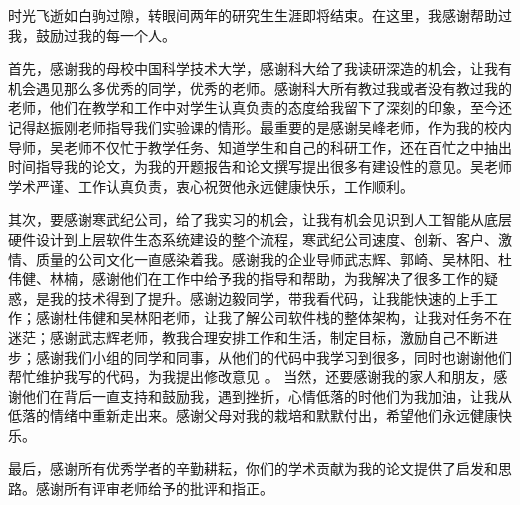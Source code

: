 
\begin{acknowledgments}
时光飞逝如白驹过隙，转眼间两年的研究生生涯即将结束。在这里，我感谢帮助过我，鼓励过我的每一个人。

首先，感谢我的母校中国科学技术大学，感谢科大给了我读研深造的机会，让我有机会遇见那么多优秀的同学，优秀的老师。感谢科大所有教过我或者没有教过我的老师，他们在教学和工作中对学生认真负责的态度给我留下了深刻的印象，至今还记得赵振刚老师指导我们实验课的情形。最重要的是感谢吴峰老师，作为我的校内导师，吴老师不仅忙于教学任务、知道学生和自己的科研工作，还在百忙之中抽出时间指导我的论文，为我的开题报告和论文撰写提出很多有建设性的意见。吴老师学术严谨、工作认真负责，衷心祝贺他永远健康快乐，工作顺利。

其次，要感谢寒武纪公司，给了我实习的机会，让我有机会见识到人工智能从底层硬件设计到上层软件生态系统建设的整个流程，寒武纪公司速度、创新、客户、激情、质量的公司文化一直感染着我。感谢我的企业导师武志辉、郭崎、吴林阳、杜伟健、林楠，感谢他们在工作中给予我的指导和帮助，为我解决了很多工作的疑惑，是我的技术得到了提升。感谢边毅同学，带我看代码，让我能快速的上手工作；感谢杜伟健和吴林阳老师，让我了解公司软件栈的整体架构，让我对任务不在迷茫；感谢武志辉老师，教我合理安排工作和生活，制定目标，激励自己不断进步；感谢我们小组的同学和同事，从他们的代码中我学习到很多，同时也谢谢他们帮忙维护我写的代码，为我提出修改意见
。
当然，还要感谢我的家人和朋友，感谢他们在背后一直支持和鼓励我，遇到挫折，心情低落的时他们为我加油，让我从低落的情绪中重新走出来。感谢父母对我的栽培和默默付出，希望他们永远健康快乐。

最后，感谢所有优秀学者的辛勤耕耘，你们的学术贡献为我的论文提供了启发和思路。感谢所有评审老师给予的批评和指正。

\end{acknowledgments}
